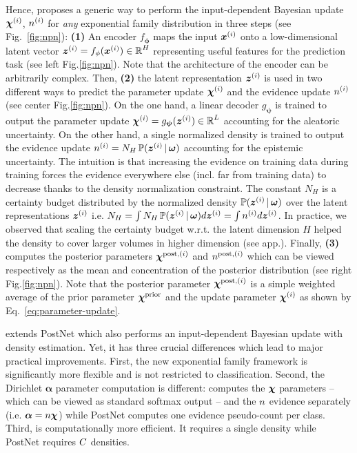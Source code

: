 Hence, \NatPNacro{} proposes a generic way to perform the input-dependent Bayesian update $\bm{\chi}^{(i)}$, $n^{(i)}$ for \emph{any} exponential family distribution in three steps (see Fig.~\ref{fig:npn}): \textbf{(1)} An encoder $f_{\bm{\phi}}$ maps the input $\bm{x}^{(i)}$ onto a low-dimensional latent vector $\bm{z}^{(i)} = f_{\phi}(\bm{x}^{(i)}) \in \operatorname{\mathbb{R}}^H$ representing useful features for the prediction task (see left Fig.\ref{fig:npn}). Note that the architecture of the encoder can be arbitrarily complex. Then, \textbf{(2)} the latent representation $\bm{z}^{(i)}$ is used in two different ways to predict the parameter update $\bm{\chi}^{(i)}$ and the evidence update $n^{(i)}$ (see center Fig.\ref{fig:npn}). On the one hand, a linear decoder $g_{\bm{\psi}}$ is trained to output the parameter update $\bm{\chi}^{(i)} = g_{\bm{\psi}}(\bm{z}^{(i)}) \in \operatorname{\mathbb{R}}^L$ accounting for the aleatoric uncertainty. On the other hand, a single normalized density is trained to output the evidence update $n^{(i)} = N_H\operatorname{\mathbb{P}}(\bm{z}^{(i)} \,|\, \bm{\omega})$ accounting for the epistemic uncertainty. The intuition is that increasing the evidence on training data during training forces the evidence everywhere else (incl. far from training data) to decrease thanks to the density normalization constraint. The constant $N_H$ is a certainty budget distributed by the normalized density $\operatorname{\mathbb{P}}(\bm{z}^{(i)} \,|\, \bm{\omega})$ over the latent representations $\bm{z}^{(i)}$ i.e. $N_H = \int N_H \operatorname{\mathbb{P}}(\bm{z}^{(i)} \,|\, \bm{\omega}) d\bm{z}^{(i)} = \int n^{(i)} d\bm{z}^{(i)}$. In practice, we observed that scaling the certainty budget w.r.t. the latent dimension $H$ helped the density to cover larger volumes in higher dimension (see app.). Finally, \textbf{(3)} \NatPNacro{} computes the posterior parameters $\bm{\chi}^{\text{post}, (i)}$ and $n^{\text{post}, (i)}$ which can be viewed respectively as the mean and concentration of the posterior distribution (see right Fig.\ref{fig:npn}). Note that the posterior parameter $\bm{\chi}^{\text{post}, (i)}$ is a simple weighted average of the prior parameter $\bm{\chi}^\text{prior}$ and the update parameter $\bm{\chi}^{(i)}$ as shown by Eq.~\ref{eq:parameter-update}.

\NatPNacro{} extends PostNet \citep{charpentier2020} which also performs an input-dependent Bayesian update with density estimation. Yet, it has three crucial differences which lead to major practical improvements. First, the new exponential family framework is significantly more flexible and is not restricted to classification. Second, the Dirichlet $\bm{\alpha}$ parameter computation is different: \NatPNacro{} computes the $\bm{\chi}$ parameters -- which can be viewed as standard softmax output -- and the $n$ evidence separately (i.e. $\bm{\alpha} = n \bm{\chi}$) while PostNet computes one evidence pseudo-count per class. Third, \NatPNacro{} is computationally more efficient. It requires a single density while PostNet requires $C$ densities.


